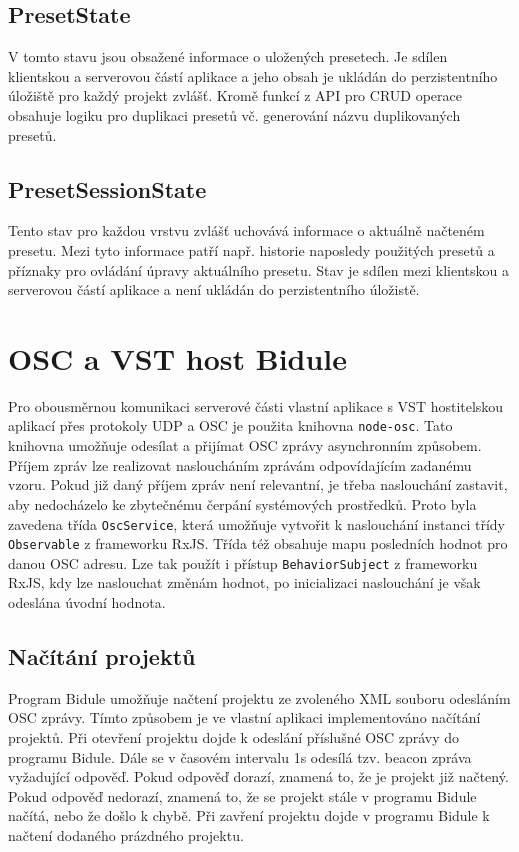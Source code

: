 \documentclass[thesis=M,czech]{FITthesis}[2019/03/06]
\begin{document}
	\subsection{PresetState}
	V tomto stavu jsou obsažené informace o uložených presetech. Je sdílen klientskou a serverovou částí aplikace a jeho obsah je ukládán do perzistentního úložiště pro každý projekt zvlášť.
	Kromě funkcí z API pro CRUD operace obsahuje logiku pro duplikaci presetů vč. generování
	názvu duplikovaných presetů.
	
	\subsection{PresetSessionState}
	Tento stav pro každou vrstvu zvlášť uchovává informace o aktuálně načteném presetu.
	Mezi tyto informace patří např. historie naposledy použitých presetů a příznaky pro 
	ovládání úpravy aktuálního presetu. Stav je sdílen mezi klientskou a serverovou částí
	aplikace a není ukládán do perzistentního úložistě.
	
	\section{OSC a VST host Bidule}
	
	Pro obousměrnou komunikaci serverové části vlastní aplikace s VST hostitelskou aplikací přes protokoly UDP a OSC je použita knihovna \texttt{node-osc}.
	Tato knihovna umožňuje odesílat a přijímat OSC zprávy asynchronním způsobem. Příjem zpráv lze realizovat 
	nasloucháním zprávám odpovídajícím zadanému vzoru. Pokud již daný příjem zpráv není relevantní, je třeba naslouchání zastavit,
	aby nedocházelo ke zbytečnému čerpání systémových prostředků. Proto byla zavedena třída \texttt{OscService}, která 
	umožňuje vytvořit k naslouchání instanci třídy \texttt{Observable} z frameworku RxJS. Třída též obsahuje 
	mapu posledních hodnot pro danou OSC adresu. Lze tak použít i přístup \texttt{BehaviorSubject} z frameworku RxJS,
	kdy lze naslouchat změnám hodnot, po inicializaci naslouchání je však odeslána úvodní hodnota.
	
	\subsection{Načítání projektů}
	Program Bidule umožňuje načtení projektu ze zvoleného XML souboru odesláním OSC zprávy. Tímto způsobem
	je ve vlastní aplikaci implementováno načítání projektů. Při otevření projektu dojde k odeslání příslušné
	OSC zprávy do programu Bidule. Dále se v časovém intervalu 1s odesílá tzv. beacon zpráva vyžadující odpověď.
	Pokud odpověď dorazí, znamená to, že je projekt již načtený. Pokud odpověď nedorazí, znamená to, že se projekt stále v programu Bidule načítá,	nebo že došlo k chybě. Při zavření projektu dojde v programu Bidule k načtení dodaného prázdného projektu.
	
\end{document}
